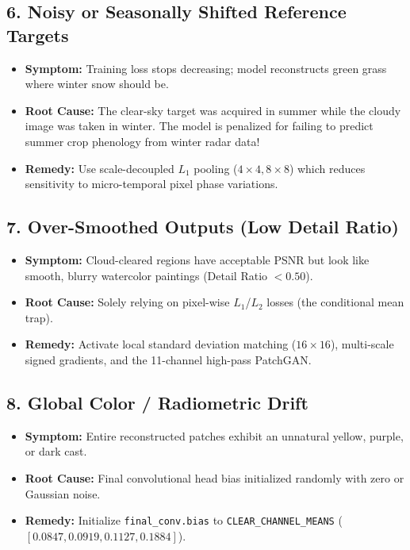 \subsection{6. Noisy or Seasonally Shifted Reference Targets}
\begin{itemize}
    \item \textbf{Symptom:} Training loss stops decreasing; model reconstructs green grass where winter snow should be.
    \item \textbf{Root Cause:} The clear-sky target was acquired in summer while the cloudy image was taken in winter. The model is penalized for failing to predict summer crop phenology from winter radar data!
    \item \textbf{Remedy:} Use scale-decoupled $L_1$ pooling ($4\times 4, 8\times 8$) which reduces sensitivity to micro-temporal pixel phase variations.
\end{itemize}

\subsection{7. Over-Smoothed Outputs (Low Detail Ratio)}
\begin{itemize}
    \item \textbf{Symptom:} Cloud-cleared regions have acceptable PSNR but look like smooth, blurry watercolor paintings (Detail Ratio $< 0.50$).
    \item \textbf{Root Cause:} Solely relying on pixel-wise $L_1$/$L_2$ losses (the conditional mean trap).
    \item \textbf{Remedy:} Activate local standard deviation matching ($16\times 16$), multi-scale signed gradients, and the 11-channel high-pass PatchGAN.
\end{itemize}

\subsection{8. Global Color / Radiometric Drift}
\begin{itemize}
    \item \textbf{Symptom:} Entire reconstructed patches exhibit an unnatural yellow, purple, or dark cast.
    \item \textbf{Root Cause:} Final convolutional head bias initialized randomly with zero or Gaussian noise.
    \item \textbf{Remedy:} Initialize \texttt{final\_conv.bias} to \texttt{CLEAR\_CHANNEL\_MEANS} ($[0.0847, 0.0919, 0.1127, 0.1884]$).
\end{itemize}

